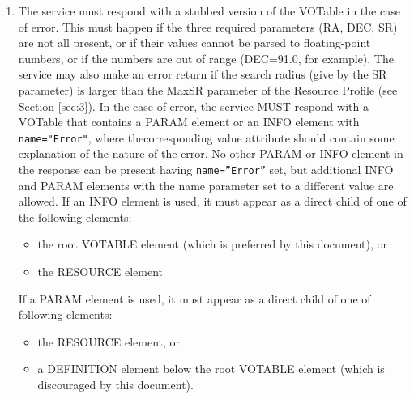 \documentclass[11pt,a4paper]{ivoa}
\begin{document}
\begin{enumerate}
	\item The service must respond with a stubbed version of the VOTable in the case
		of error. This must happen if the three required parameters (RA, DEC,
		SR) are not all present, or if their values cannot be parsed to
		floating-point numbers, or if the numbers are out of range (DEC=91.0,
		for example). The service may also make an error return if the search
		radius (give by the SR parameter) is larger than the MaxSR parameter of
		the Resource Profile (see Section \ref{sec:3}). In the case of error,
		the service MUST respond with a VOTable that contains a PARAM element or
		an INFO element with \texttt{name="Error"}, where thecorresponding value
		attribute should contain some explanation of the nature of the error. No
		other PARAM or INFO element in the response can be present having
		\texttt{name=''Error''} set, but additional INFO and PARAM elements with
		the name parameter set to a different value are allowed. If an INFO
		element is used, it must appear as a direct child of one of the
		following elements:
		
		\begin{itemize} 
			\item the root VOTABLE element	(which is preferred by this document), or
			\item the RESOURCE element
		\end{itemize}
		
		If a PARAM element is used, it must appear as a direct
		child of one of following elements:
		
		\begin{itemize}
			\item the RESOURCE element, or
			\item a DEFINITION element below the root VOTABLE element
				(which is discouraged by this document).
		\end{itemize}

\end{enumerate}
\end{document}
